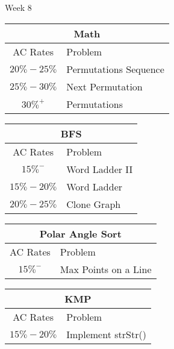 \documentclass[paper=a4, fontsize=11pt]{scrartcl} %
\begin{document}
\begin{center}
  \pagebreak

  \begin{center}
    Week 8
  \end{center}

  \begin{tabular}{|c|l|}
      \hline
      \multicolumn{2}{|c|}{Math} \\
      \hline
      AC Rates      &   Problem     \\
      \hline
      \multirow{1}{*}{$20\%-25\%$}  &    Permutations Sequence \\
      \hline
      \multirow{1}{*}{$25\%-30\%$}  &    Next Permutation \\
      \hline
      \multirow{1}{*}{$30\%^+$}  & Permutations    \\
      \hline
  \end{tabular}

  \vspace{10mm}

  \begin{tabular}{|c|l|}
      \hline
      \multicolumn{2}{|c|}{BFS} \\
      \hline
      AC Rates      &   Problem     \\
      \hline
      \multirow{1}{*}{$15\%^-$}  &    Word Ladder II   \\
      \hline
      \multirow{1}{*}{$15\%-20\%$}  &    Word Ladder    \\
      \hline
      \multirow{1}{*}{$20\%-25\%$}  &    Clone Graph    \\
      \hline
  \end{tabular}

  \vspace{10mm}

  \begin{tabular}{|c|l|}
      \hline
      \multicolumn{2}{|c|}{Polar Angle Sort} \\
      \hline
      AC Rates      &   Problem     \\
      \hline
      \multirow{1}{*}{$15\%^-$}  &    Max Points on a Line    \\
      \hline
  \end{tabular}

  \vspace{10mm}

  \begin{tabular}{|c|l|}
      \hline
      \multicolumn{2}{|c|}{KMP} \\
      \hline
      AC Rates      &   Problem     \\
      \hline
      \multirow{1}{*}{$15\%-20\%$}  &    Implement strStr() \\
      \hline
  \end{tabular}
\end{center}
\end{document}
